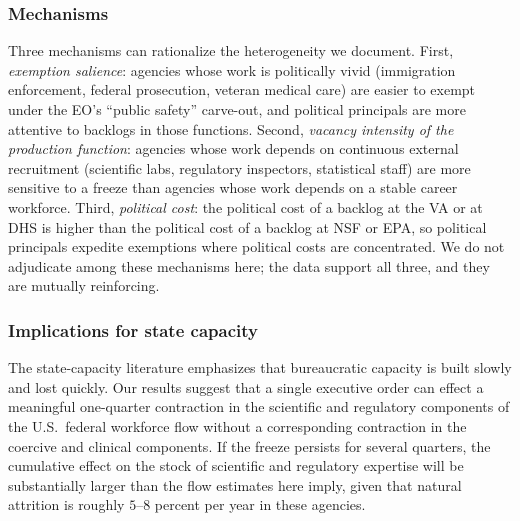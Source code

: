 \documentclass[12pt]{article}
\begin{document}
\subsubsection*{Mechanisms} Three mechanisms can rationalize the heterogeneity we document. First, \emph{exemption salience}: agencies whose work is politically vivid (immigration enforcement, federal prosecution, veteran medical care) are easier to exempt under the EO's ``public safety'' carve-out, and political principals are more attentive to backlogs in those functions. Second, \emph{vacancy intensity of the production function}: agencies whose work depends on continuous external recruitment (scientific labs, regulatory inspectors, statistical staff) are more sensitive to a freeze than agencies whose work depends on a stable career workforce. Third, \emph{political cost}: the political cost of a backlog at the VA or at DHS is higher than the political cost of a backlog at NSF or EPA, so political principals expedite exemptions where political costs are concentrated. We do not adjudicate among these mechanisms here; the data support all three, and they are mutually reinforcing.

\subsubsection*{Implications for state capacity} The state-capacity literature \citep{besley2009origins,finan2017personnel,dal2013strengthening} emphasizes that bureaucratic capacity is built slowly and lost quickly. Our results suggest that a single executive order can effect a meaningful one-quarter contraction in the scientific and regulatory components of the U.S.\ federal workforce flow without a corresponding contraction in the coercive and clinical components. If the freeze persists for several quarters, the cumulative effect on the stock of scientific and regulatory expertise will be substantially larger than the flow estimates here imply, given that natural attrition is roughly $5$--$8$ percent per year in these agencies.
\end{document}
